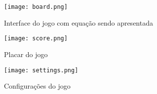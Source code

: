 \begin{figure}
    \centering
    \texttt{[image: board.png]}
	\caption{Interface do jogo com equação sendo apresentada}
    \label{fig:interface}
\end{figure}

\begin{figure}
    \centering
    \texttt{[image: score.png]}
	\caption{Placar do jogo}
\end{figure}

\begin{figure}
    \centering
    \texttt{[image: settings.png]}
	\caption{Configurações do jogo}
\end{figure}

